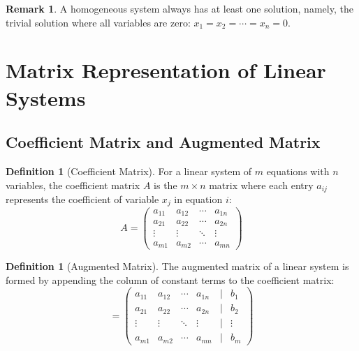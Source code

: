 \documentclass[12pt,a4paper]{article}
\theoremstyle{plain}
\theoremstyle{definition}
\newtheorem{definition}[theorem]{Definition}
\newtheorem{remark}[theorem]{Remark}
\begin{document}
\begin{remark}
A homogeneous system always has at least one solution, namely, the trivial solution where all variables are zero: $x_1 = x_2 = \cdots = x_n = 0$.
\end{remark}

\section{Matrix Representation of Linear Systems}

\subsection{Coefficient Matrix and Augmented Matrix}

\begin{definition}[Coefficient Matrix]
For a linear system of $m$ equations with $n$ variables, the coefficient matrix $A$ is the $m \times n$ matrix where each entry $a_{ij}$ represents the coefficient of variable $x_j$ in equation $i$:
\begin{equation}
A = \begin{pmatrix}
a_{11} & a_{12} & \cdots & a_{1n} \\
a_{21} & a_{22} & \cdots & a_{2n} \\
\vdots & \vdots & \ddots & \vdots \\
a_{m1} & a_{m2} & \cdots & a_{mn}
\end{pmatrix}
\end{equation}
\end{definition}

\begin{definition}[Augmented Matrix]
The augmented matrix of a linear system is formed by appending the column of constant terms to the coefficient matrix:
\begin{equation}
[A|b] = \begin{pmatrix}
a_{11} & a_{12} & \cdots & a_{1n} & | & b_1 \\
a_{21} & a_{22} & \cdots & a_{2n} & | & b_2 \\
\vdots & \vdots & \ddots & \vdots & | & \vdots \\
a_{m1} & a_{m2} & \cdots & a_{mn} & | & b_m
\end{pmatrix}
\end{equation}
\end{definition}
\end{document}
